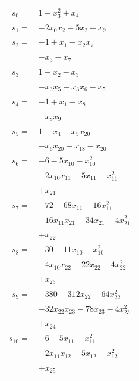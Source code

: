 \begingroup
\small
\setlength{\tabcolsep}{2pt}
\setlength{\LTleft}{0pt}
\begin{longtable}{@{}r@{\;}l@{}}
\(s_{0}=\) & \(\displaystyle 1 -x_{3}^{2} +x_{4}\) \\[3pt]
\(s_{1}=\) & \(\displaystyle -2x_{0}x_{2} -5x_{2} +x_{9}\) \\[3pt]
\(s_{2}=\) & \(\displaystyle -1 +x_{1} -x_{2}x_{7}\) \\
 & \(\displaystyle -x_{3} -x_{7}\) \\[3pt]
\(s_{3}=\) & \(\displaystyle 1 +x_{2} -x_{3}\) \\
 & \(\displaystyle -x_{3}x_{5} -x_{3}x_{6} -x_{5}\) \\[3pt]
\(s_{4}=\) & \(\displaystyle -1 +x_{1} -x_{8}\) \\
 & \(\displaystyle -x_{8}x_{9}\) \\[3pt]
\(s_{5}=\) & \(\displaystyle 1 -x_{4} -x_{5}x_{20}\) \\
 & \(\displaystyle -x_{6}x_{20} +x_{18} -x_{20}\) \\[3pt]
\(s_{6}=\) & \(\displaystyle -6 -5x_{10} -x_{10}^{2}\) \\
 & \(\displaystyle -2x_{10}x_{11} -5x_{11} -x_{11}^{2}\) \\
 & \(\displaystyle +x_{21}\) \\[3pt]
\(s_{7}=\) & \(\displaystyle -72 -68x_{11} -16x_{11}^{2}\) \\
 & \(\displaystyle -16x_{11}x_{21} -34x_{21} -4x_{21}^{2}\) \\
 & \(\displaystyle +x_{22}\) \\[3pt]
\(s_{8}=\) & \(\displaystyle -30 -11x_{10} -x_{10}^{2}\) \\
 & \(\displaystyle -4x_{10}x_{22} -22x_{22} -4x_{22}^{2}\) \\
 & \(\displaystyle +x_{23}\) \\[3pt]
\(s_{9}=\) & \(\displaystyle -380 -312x_{22} -64x_{22}^{2}\) \\
 & \(\displaystyle -32x_{22}x_{23} -78x_{23} -4x_{23}^{2}\) \\
 & \(\displaystyle +x_{24}\) \\[3pt]
\(s_{10}=\) & \(\displaystyle -6 -5x_{11} -x_{11}^{2}\) \\
 & \(\displaystyle -2x_{11}x_{12} -5x_{12} -x_{12}^{2}\) \\
 & \(\displaystyle +x_{25}\) \\[3pt]

\end{longtable}
